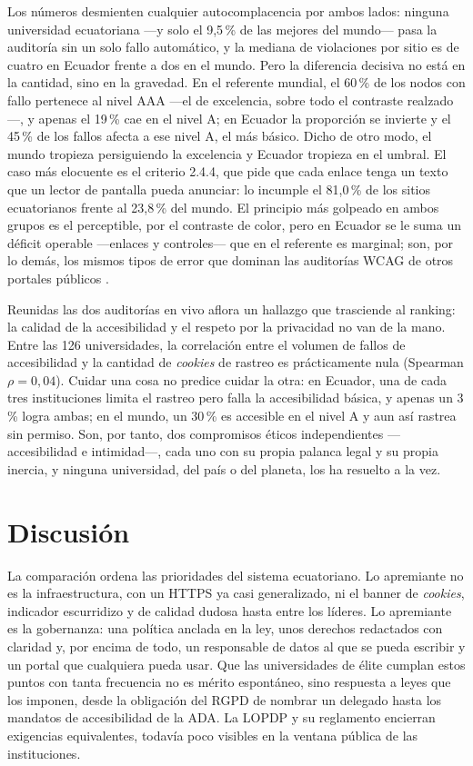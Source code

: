 \documentclass[11pt,a4paper]{article}
\begin{document}
Los números desmienten cualquier autocomplacencia por ambos lados: ninguna universidad ecuatoriana ---y solo el 9,5\,\% de las mejores del mundo--- pasa la auditoría sin un solo fallo automático, y la mediana de violaciones por sitio es de cuatro en Ecuador frente a dos en el mundo. Pero la diferencia decisiva no está en la cantidad, sino en la gravedad. En el referente mundial, el 60\,\% de los nodos con fallo pertenece al nivel AAA ---el de excelencia, sobre todo el contraste realzado---, y apenas el 19\,\% cae en el nivel A; en Ecuador la proporción se invierte y el 45\,\% de los fallos afecta a ese nivel A, el más básico. Dicho de otro modo, el mundo tropieza persiguiendo la excelencia y Ecuador tropieza en el umbral. El caso más elocuente es el criterio 2.4.4, que pide que cada enlace tenga un texto que un lector de pantalla pueda anunciar: lo incumple el 81,0\,\% de los sitios ecuatorianos frente al 23,8\,\% del mundo. El principio más golpeado en ambos grupos es el perceptible, por el contraste de color, pero en Ecuador se le suma un déficit operable ---enlaces y controles--- que en el referente es marginal; son, por lo demás, los mismos tipos de error que dominan las auditorías WCAG de otros portales públicos \citep{iniesto2025service}.

Reunidas las dos auditorías en vivo aflora un hallazgo que trasciende al ranking: la calidad de la accesibilidad y el respeto por la privacidad no van de la mano. Entre las 126 universidades, la correlación entre el volumen de fallos de accesibilidad y la cantidad de \emph{cookies} de rastreo es prácticamente nula (Spearman $\rho=0{,}04$). Cuidar una cosa no predice cuidar la otra: en Ecuador, una de cada tres instituciones limita el rastreo pero falla la accesibilidad básica, y apenas un 3\,\% logra ambas; en el mundo, un 30\,\% es accesible en el nivel A y aun así rastrea sin permiso. Son, por tanto, dos compromisos éticos independientes ---accesibilidad e intimidad---, cada uno con su propia palanca legal y su propia inercia, y ninguna universidad, del país o del planeta, los ha resuelto a la vez.

\section{Discusi\'on}\label{sec:discusion}
La comparación ordena las prioridades del sistema ecuatoriano. Lo apremiante no es la infraestructura, con un HTTPS ya casi generalizado, ni el banner de \emph{cookies}, indicador escurridizo y de calidad dudosa hasta entre los líderes. Lo apremiante es la gobernanza: una política anclada en la ley, unos derechos redactados con claridad y, por encima de todo, un responsable de datos al que se pueda escribir y un portal que cualquiera pueda usar. Que las universidades de élite cumplan estos puntos con tanta frecuencia no es mérito espontáneo, sino respuesta a leyes que los imponen, desde la obligación del RGPD de nombrar un delegado hasta los mandatos de accesibilidad de la ADA. La LOPDP y su reglamento encierran exigencias equivalentes, todavía poco visibles en la ventana pública de las instituciones.
\end{document}
